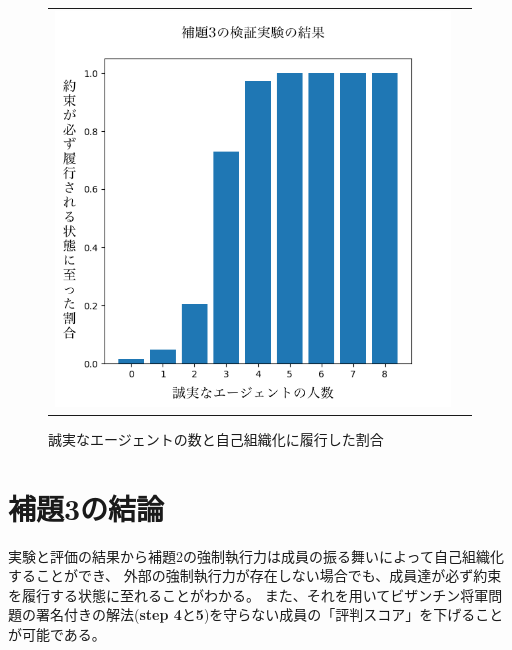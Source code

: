 \begin{figure}[h]
  \begin{tabular}{cc}
    \begin{minipage}[t]{1\hsize}
      \centering
      \includegraphics[keepaspectratio, width=1\linewidth]{./07_complex-system/figure01.png}
      \caption{誠実なエージェントの数と自己組織化に履行した割合}
      \label{compex-system-002}
    \end{minipage}
  \end{tabular}
\end{figure}

\section{補題3の結論}
実験と評価の結果から補題2の強制執行力は成員の振る舞いによって自己組織化することができ、
外部の強制執行力が存在しない場合でも、成員達が必ず約束を履行する状態に至れることがわかる。
また、それを用いてビザンチン将軍問題の署名付きの解法(\textbf{step 4}と\textbf{5})を守らない成員の「評判スコア」を下げることが可能である。
